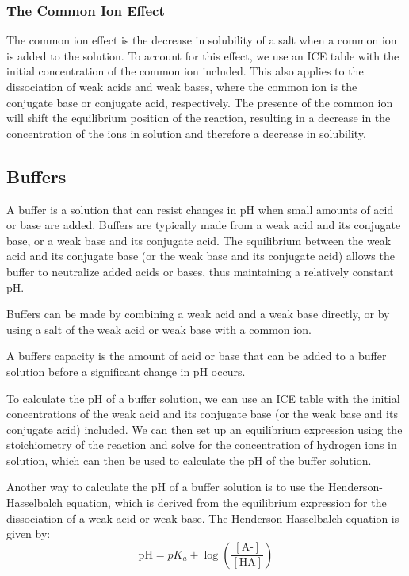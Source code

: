 \subsubsection{The Common Ion Effect}
The common ion effect is the decrease in solubility of a salt when a common ion is added to the solution. To account for this effect, we use an ICE table with the initial concentration of the common ion included. This also applies to the dissociation of weak acids and weak bases, where the common ion is the conjugate base or conjugate acid, respectively. The presence of the common ion will shift the equilibrium position of the reaction, resulting in a decrease in the concentration of the ions in solution and therefore a decrease in solubility.
\subsection{Buffers}
A buffer is a solution that can resist changes in pH when small amounts of acid or base are added. Buffers are typically made from a weak acid and its conjugate base, or a weak base and its conjugate acid. The equilibrium between the weak acid and its conjugate base (or the weak base and its conjugate acid) allows the buffer to neutralize added acids or bases, thus maintaining a relatively constant pH. 

Buffers can be made by combining a weak acid and a weak base directly, or by using a salt of the weak acid or weak base with a common ion. 

A buffers capacity is the amount of acid or base that can be added to a buffer solution before a significant change in pH occurs. 

To calculate the pH of a buffer solution, we can use an ICE table with the initial concentrations of the weak acid and its conjugate base (or the weak base and its conjugate acid) included. We can then set up an equilibrium expression using the stoichiometry of the reaction and solve for the concentration of hydrogen ions in solution, which can then be used to calculate the pH of the buffer solution.

Another way to calculate the pH of a buffer solution is to use the Henderson-Hasselbalch equation, which is derived from the equilibrium expression for the dissociation of a weak acid or weak base. The Henderson-Hasselbalch equation is given by:
\begin{equation}\label{eq:Henderson_Hasselbalch_pH}
    \text{pH} = pK_a + \log \left( \frac{[\text{A-}]}{[\text{HA}]} \right)
\end{equation}

